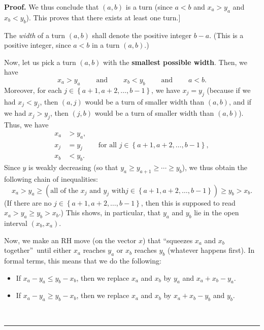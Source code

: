 \documentclass[numbers=enddot,12pt,final,onecolumn,notitlepage]{scrartcl}%
\numberwithin{exer}{subsection}
\theoremstyle{definition}
\newenvironment{proof}[1][Proof]{\noindent\textbf{#1.} }{\ \rule{0.5em}{0.5em}}
\begin{document}
\begin{proof}
We thus conclude that $\left(  a,b\right)  $ is a turn (since $a<b$ and
$x_{a}>y_{a}$ and $x_{b}<y_{b}$). This proves that there exists at least one
turn.] \medskip

The \emph{width} of a turn $\left(  a,b\right)  $ shall denote the positive
integer $b-a$. (This is a positive integer, since $a<b$ in a turn $\left(
a,b\right)  $.)

Now, let us pick a turn $\left(  a,b\right)  $ with the \textbf{smallest
possible width}. Then, we have%
\[
x_{a}>y_{a}\ \ \ \ \ \ \ \ \ \ \text{and}\ \ \ \ \ \ \ \ \ \ x_{b}%
<y_{b}\ \ \ \ \ \ \ \ \ \ \text{and}\ \ \ \ \ \ \ \ \ \ a<b.
\]
Moreover, for each $j\in\left\{  a+1,a+2,\ldots,b-1\right\}  $, we have
$x_{j}=y_{j}$ (because if we had $x_{j}<y_{j}$, then $\left(  a,j\right)  $
would be a turn of smaller width than $\left(  a,b\right)  $, and if we had
$x_{j}>y_{j}$, then $\left(  j,b\right)  $ would be a turn of smaller width
than $\left(  a,b\right)  $). Thus, we have
\begin{align*}
x_{a} &  >y_{a},\\
x_{j} &  =y_{j}\ \ \ \ \ \ \ \ \ \ \text{for all }j\in\left\{  a+1,a+2,\ldots
,b-1\right\}  ,\\
x_{b} &  <y_{b}.
\end{align*}
Since $y$ is weakly decreasing (so that $y_{a}\geq y_{a+1}\geq\cdots\geq
y_{b}$), we thus obtain the following chain of inequalities:%
\[
x_{a}>y_{a}\geq\left(  \text{all of the }x_{j}\text{ and }y_{j}\text{ with
}j\in\left\{  a+1,a+2,\ldots,b-1\right\}  \right)  \geq y_{b}>x_{b}.
\]
(If there are no $j\in\left\{  a+1,a+2,\ldots,b-1\right\}  $, then this is
supposed to read $x_{a}>y_{a}\geq y_{b}>x_{b}$.) This shows, in particular,
that $y_{a}$ and $y_{b}$ lie in the open interval $\left(  x_{b},x_{a}\right)
$.

Now, we make an RH move (on the vector $x$) that \textquotedblleft squeezes
$x_{a}$ and $x_{b}$ together\textquotedblright\ until either $x_{a}$ reaches
$y_{a}$ or $x_{b}$ reaches $y_{b}$ (whatever happens first). In formal terms,
this means that we do the following:

\begin{itemize}
\item If $x_{a}-y_{a}\leq y_{b}-x_{b}$, then we replace $x_{a}$ and $x_{b}$ by
$y_{a}$ and $x_{a}+x_{b}-y_{a}$.

\item If $x_{a}-y_{a}\geq y_{b}-x_{b}$, then we replace $x_{a}$ and $x_{b}$ by
$x_{a}+x_{b}-y_{b}$ and $y_{b}$.
\end{itemize}


\end{proof}
\end{document}

